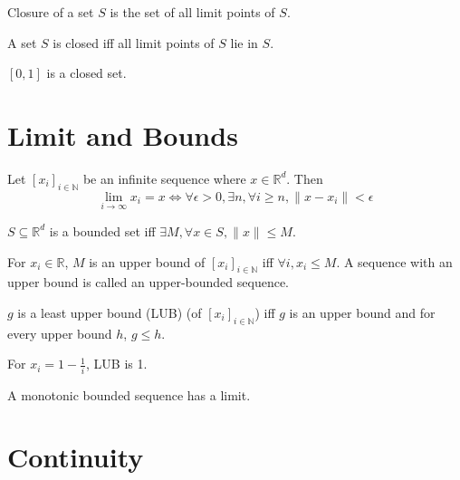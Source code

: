 \begin{definition} Closure of a set $S$ is the set of all limit points of $S$. \end{definition}

\begin{definition} A set $S$ is closed iff all limit points of $S$ lie in $S$. \end{definition}

\begin{example} $[0, 1]$ is a closed set. \end{example}

\section{Limit and Bounds}

\begin{definition} Let $[x_i]_{i \in \mathbb{N}}$ be an infinite sequence
where $x \in \mathbb{R}^d$. Then
\[ \lim_{i \rightarrow \infty} x_i = x
\iff \forall \epsilon > 0, \exists n, \forall i \ge n, \|x - x_i\| < \epsilon \]
\end{definition}

\begin{definition} $S \subseteq \mathbb{R}^d$ is a bounded set
iff $\exists M, \forall x \in S, \|x\| \le M$. \end{definition}

\begin{definition} For $x_i \in \mathbb{R}$, $M$ is an upper bound of $[x_i]_{i \in \mathbb{N}}$
iff $\forall i, x_i \le M$. A sequence with an upper bound is called an upper-bounded sequence.
\end{definition}

\begin{definition} $g$ is a least upper bound (LUB) (of $[x_i]_{i \in \mathbb{N}}$) iff
$g$ is an upper bound and for every upper bound $h$, $g \le h$. \end{definition}

\begin{example} For $x_i = 1-\frac{1}{i}$, LUB is 1. \end{example}

\begin{theorem} A monotonic bounded sequence has a limit. \end{theorem}

\section{Continuity}

